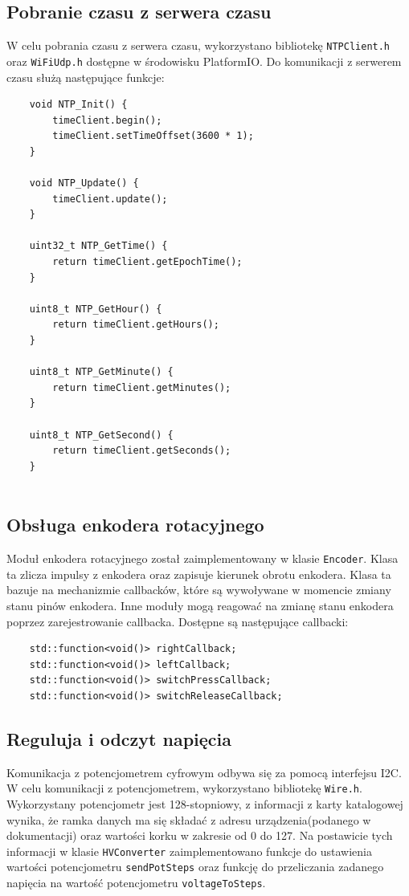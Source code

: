 \documentclass[../main.tex]{subfiles}
\begin{document}
\subsection{Pobranie czasu z serwera czasu}
W celu pobrania czasu z serwera czasu, wykorzystano bibliotekę \texttt{NTPClient.h} oraz \texttt{WiFiUdp.h} dostępne w środowisku PlatformIO.
Do komunikacji z serwerem czasu służą następujące funkcje:

\begin{verbatim}
    void NTP_Init() {
        timeClient.begin();
        timeClient.setTimeOffset(3600 * 1);
    }
    
    void NTP_Update() {
        timeClient.update();
    }
    
    uint32_t NTP_GetTime() {
        return timeClient.getEpochTime();
    }
    
    uint8_t NTP_GetHour() {
        return timeClient.getHours();
    }
    
    uint8_t NTP_GetMinute() {
        return timeClient.getMinutes();
    }
    
    uint8_t NTP_GetSecond() {
        return timeClient.getSeconds();
    }
    
\end{verbatim}

\subsection{Obsługa enkodera rotacyjnego}
Moduł enkodera rotacyjnego został zaimplementowany w klasie \texttt{Encoder}. Klasa ta zlicza impulsy z enkodera oraz zapisuje kierunek obrotu enkodera.
Klasa ta bazuje na mechanizmie callbacków, które są wywoływane w momencie zmiany stanu pinów enkodera. Inne moduły mogą reagować na zmianę stanu enkodera poprzez zarejestrowanie callbacka.
Dostępne są następujące callbacki:

\begin{verbatim}
    std::function<void()> rightCallback;
    std::function<void()> leftCallback;
    std::function<void()> switchPressCallback;
    std::function<void()> switchReleaseCallback;
\end{verbatim}

\subsection{Reguluja i odczyt napięcia} 
Komunikacja z potencjometrem cyfrowym odbywa się za pomocą interfejsu I2C.
 W celu komunikacji z potencjometrem, wykorzystano bibliotekę \texttt{Wire.h}. Wykorzystany potencjometr jest 128-stopniowy, z informacji z 
 karty katalogowej \cite{st:potencjometr} wynika, że ramka danych ma się składać z adresu urządzenia(podanego w dokumentacji) oraz wartości korku w zakresie od 0 do 127.
 Na postawicie tych informacji w klasie \texttt{HVConverter} zaimplementowano funkcje do ustawienia wartości potencjometru \texttt{sendPotSteps} oraz funkcję 
 do przeliczania zadanego napięcia na wartość potencjometru \texttt{voltageToSteps}.
\end{document}
